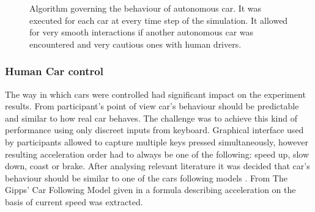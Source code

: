 \documentclass[11pt,english]{article}
\begin{document}
\begin{figure}[!] %
\caption{Algorithm governing the behaviour of autonomous car. It was executed for each car at every time step of the simulation. It allowed for very smooth interactions if another autonomous car was encountered and very cautious ones with human drivers.}
\label{fig:idm_upgrade}
\end{figure} 


\subsubsection{Human Car control}

The way in which cars were controlled had significant impact on the experiment results. From participant's point of view car's behaviour should be predictable and similar to how real car behaves. The challenge was to achieve this kind of performance using only discreet inputs from keyboard. Graphical interface used by participants allowed to capture multiple keys pressed simultaneously, however resulting acceleration order had to always be one of the following: speed up, slow down, coast or brake. After analysing relevant literature it was decided that car's behaviour should be similar to one of the cars following models \citep{treiber2013traffic}. From The Gipps' Car Following Model given in \citet{spyropoulou2007simulation} a formula describing acceleration on the basis of current speed was extracted.
\end{document}
